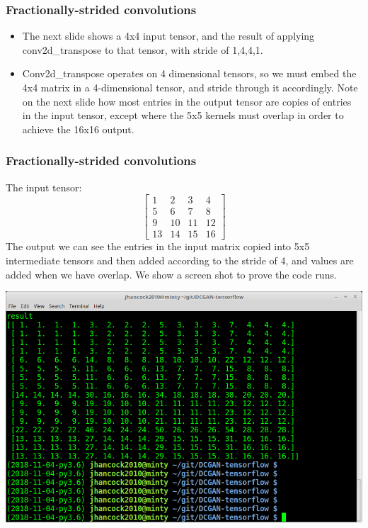 \documentclass{beamer}
\begin{document}

\begin{frame}
\frametitle{Fractionally-strided convolutions}
\begin{itemize}

\item The next slide shows  a 4x4  input tensor, and the result of applying 
conv2d\_transpose to that tensor, with stride of 1,4,4,1. 

\item Conv2d\_transpose operates on 4 dimensional tensors, so we must embed the  4x4
matrix in a 4-dimensional tensor, and stride through it accordingly. Note on the 
next slide how most entries in the output tensor are copies of entries in the input
tensor, except where the 5x5 kernels must overlap in order to achieve the 
16x16 output.
\end{itemize}
\end{frame}


\begin{frame}
\frametitle{Fractionally-strided convolutions}
The input tensor:
\[
\begin{bmatrix}
  1 & 2 & 3 & 4 \\
  5 & 6 & 7 & 8 \\ 
  9 & 10 & 11 & 12 \\
  13 & 14 & 15 & 16
\end{bmatrix}
\]
The output we can see the entries in the input matrix copied into 5x5 intermediate
tensors and then added according to the stride of 4, and values are added when
we have overlap.  We show a screen shot to prove the code runs.

\includegraphics[scale=0.25]{conv2d-result}

\end{frame}
\end{document}
